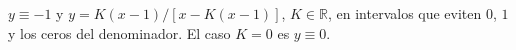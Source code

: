$y\equiv-1$ y $y=K(x-1)/[x-K(x-1)]$, $K\in\mathbb R$, en intervalos que eviten $0$, $1$ y los ceros del denominador. El caso $K=0$ es $y\equiv0$.
